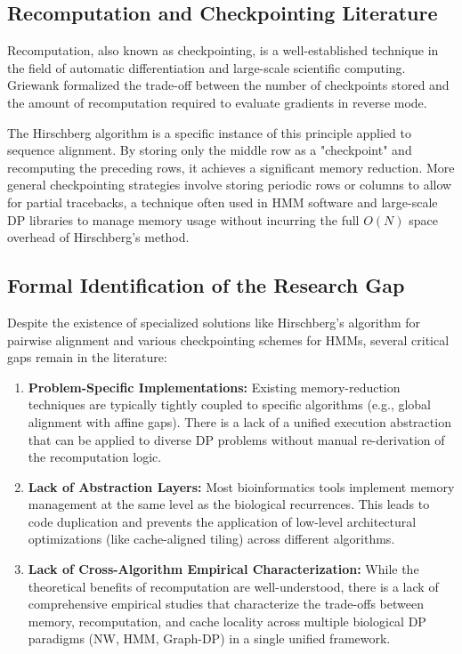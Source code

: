 \subsection{Recomputation and Checkpointing Literature}
Recomputation, also known as checkpointing, is a well-established technique in the field of automatic differentiation and large-scale scientific computing. Griewank \cite{Griewank1992, Griewank2000} formalized the trade-off between the number of checkpoints stored and the amount of recomputation required to evaluate gradients in reverse mode.

The Hirschberg algorithm is a specific instance of this principle applied to sequence alignment. By storing only the middle row as a "checkpoint" and recomputing the preceding rows, it achieves a significant memory reduction. More general checkpointing strategies involve storing periodic rows or columns to allow for partial tracebacks, a technique often used in HMM software and large-scale DP libraries to manage memory usage without incurring the full $O(N)$ space overhead of Hirschberg's method.

\subsection{Formal Identification of the Research Gap}
Despite the existence of specialized solutions like Hirschberg's algorithm for pairwise alignment and various checkpointing schemes for HMMs, several critical gaps remain in the literature:

\begin{enumerate}
    \item \textbf{Problem-Specific Implementations:} Existing memory-reduction techniques are typically tightly coupled to specific algorithms (e.g., global alignment with affine gaps). There is a lack of a unified execution abstraction that can be applied to diverse DP problems without manual re-derivation of the recomputation logic.
    \item \textbf{Lack of Abstraction Layers:} Most bioinformatics tools implement memory management at the same level as the biological recurrences. This leads to code duplication and prevents the application of low-level architectural optimizations (like cache-aligned tiling) across different algorithms.
    \item \textbf{Lack of Cross-Algorithm Empirical Characterization:} While the theoretical benefits of recomputation are well-understood, there is a lack of comprehensive empirical studies that characterize the trade-offs between memory, recomputation, and cache locality across multiple biological DP paradigms (NW, HMM, Graph-DP) in a single unified framework.
\end{enumerate}

